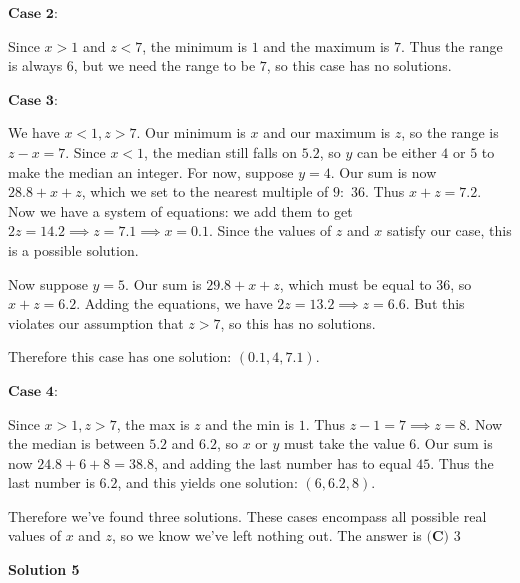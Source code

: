 \begin{enumerate}
 $\textbf{Case 2:}$

 Since $x>1$ and $z<7$, the minimum is $1$ and the maximum is $7$. Thus the range is always $6$, but we need the range to be $7$, so this case has no solutions.

 $\textbf{Case 3:}$

 We have $x<1, z>7$. Our minimum is $x$ and our maximum is $z$, so the range is $z-x = 7$. Since $x<1$, the median still falls on $5.2$, so $y$ can be either $4$ or $5$ to make the median an integer. For now, suppose $y=4$. Our sum is now $28.8+x+z$, which we set to the nearest multiple of $9:$ $36$. Thus $x+z = 7.2$. Now we have a system of equations: we add them to get $2z = 14.2 \implies z = 7.1 \implies x = 0.1$. Since the values of $z$ and $x$ satisfy our case, this is a possible solution.

 Now suppose $y=5$. Our sum is $29.8+x+z$, which must be equal to $36$, so $x+z = 6.2$. Adding the equations, we have $2z = 13.2 \implies z = 6.6$. But this violates our assumption that $z>7$, so this has no solutions.

 Therefore this case has one solution: $(0.1,4,7.1)$.

 $\textbf{Case 4:}$

 Since $x>1, z>7$, the max is $z$ and the min is $1$. Thus $z-1 = 7 \implies z = 8$. Now the median is between $5.2$ and $6.2$, so $x$ or $y$ must take the value $6$. Our sum is now $24.8+6+8 = 38.8$, and adding the last number has to equal $45$. Thus the last number is $6.2$, and this yields one solution: $(6,6.2,8)$.

 


 
Therefore we've found three solutions. These cases encompass all possible real values of $x$ and $z$, so we know we've left nothing out. The answer is $\boxed{\textbf{(C) }3}$




\textbf{Solution 5}


\end{enumerate}
